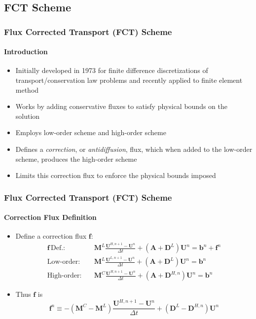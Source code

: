 \documentclass{beamer}
\newcommand{\U}{\mathbf{U}}
\newcommand{\M}{\mathbf{M}}
\newcommand{\A}{\mathbf{A}}
\newcommand{\D}{\mathbf{D}}
\newcommand{\f}{\mathbf{f}}
\renewcommand{\b}{\mathbf{b}}
\newcommand{\dt}{\Delta t}
\begin{document}
\subsection{FCT Scheme}
\begin{frame}
\frametitle{Flux Corrected Transport (FCT) Scheme}
\framesubtitle{Introduction}

\begin{itemize}
   \item Initially developed in 1973 for finite difference discretizations of
      transport/conservation law problems and recently applied to finite element method
   \item Works by adding conservative fluxes to satisfy physical bounds on the solution
   \item Employs low-order scheme and high-order scheme
   \item Defines a \emph{correction}, or \emph{antidiffusion}, flux, which
      when added to the low-order scheme, produces the high-order scheme
   \item Limits this correction flux to enforce the physical bounds imposed
\end{itemize}

\end{frame}
\begin{frame}
\frametitle{Flux Corrected Transport (FCT) Scheme}
\framesubtitle{Correction Flux Definition}

\begin{itemize}
   \item Define a correction flux $\f$:
   \begin{align*}
      \f\,\mbox{Def.:}\quad   & \M^L\frac{\U^{H,n+1}-\U^n}{\dt}+(\A+\D^L)\U^n = \b^n + \f^n\\
      \mbox{Low-order:}\quad  & \M^L\frac{\U^{L,n+1}-\U^n}{\dt}+(\A + \D^L)\U^n = \b^n\\
      \mbox{High-order:}\quad & \M^C\frac{\U^{H,n+1}-\U^n}{\dt}+(\A + \D^{H,n})\U^n = \b^n
   \end{align*}
   \item Thus $\f$ is
   \begin{equation}
      \f^n \equiv -(\M^C-\M^L)\frac{\U^{H,n+1}-\U^n}{\dt} +(\D^L-\D^{H,n})\U^n
   \end{equation}
\end{itemize}

\end{frame}
\end{document}
